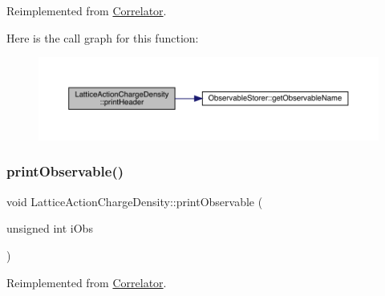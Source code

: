 Reimplemented from \mbox{\hyperlink{class_correlator_ac7c5a07d7cbee97c417a1659b93083b2}{Correlator}}.

Here is the call graph for this function\+:\nopagebreak
\begin{figure}[H]
\begin{center}
\leavevmode
\includegraphics[width=350pt]{class_lattice_action_charge_density_a2a7a806862f23975161316a37f47f22e_cgraph}
\end{center}
\end{figure}
\mbox{\label{class_lattice_action_charge_density_abb7db718d4069faab0ed19f31aa85ad4}} 
\subsubsection{\texorpdfstring{printObservable()}{printObservable()}}
{\footnotesize\ttfamily void Lattice\+Action\+Charge\+Density\+::print\+Observable (\begin{DoxyParamCaption}\item[{unsigned int}]{i\+Obs }\end{DoxyParamCaption})\hspace{0.3cm}{\ttfamily [virtual]}}



Reimplemented from \mbox{\hyperlink{class_correlator_a15744ddb9f2b71fff34ac762d101df38}{Correlator}}.

